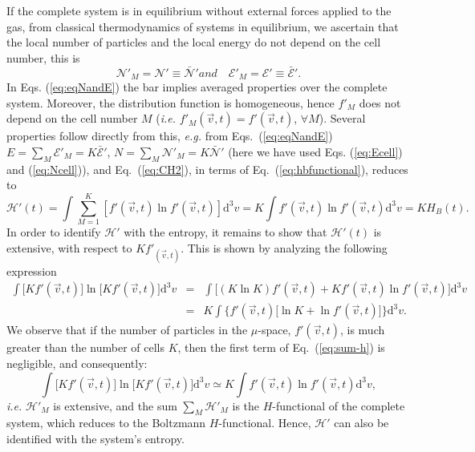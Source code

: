 If the complete system is in equilibrium without external forces applied to
the gas, from classical thermodynamics of
systems in equilibrium, we ascertain that the local number
of particles and the local
energy do not depend on the cell number, this is
%
\begin{subequations}\label{eq:eqNandE}
\begin{equation}
   \mathcal{N}'_M=\mathcal{N}'\equiv \bar{\mathcal{N}}'
\end{equation}
%
and
%
\begin{equation}
   \quad\mathcal{E}'_M=\mathcal{E}'\equiv\bar{\mathcal{E}}'.
\end{equation}
\end{subequations}
%
In Eqs. (\ref{eq:eqNandE}) the bar implies averaged properties over the complete system.
Moreover, the distribution function is homogeneous, hence $f'_M$
does not depend on the cell number $M$ (\textit{i.e.} $f'_M(\vec v,t)=f'(\vec v,t)$,
$\forall M$). Several properties follow directly from this, \textit{e.g.}
from Eqs.~(\ref{eq:eqNandE}) $E=\sum_M\mathcal{E}'_M=K\bar{\mathcal{E}}'$, $N=\sum_M\mathcal{N}'_M=K\bar{\mathcal{N}}'$ (here we have used Eqs. (\ref{eq:Ecell})
and (\ref{eq:Ncell})),
and Eq.~(\ref{eq:CH2}), in terms of Eq.~(\ref{eq:hbfunctional}), reduces to
%
\begin{equation}
    \mathcal{H}'(t)=\int \sum_{M=1}^{K} [f'(\vec{v},t)\ln f'(\vec{v},t)] \mathrm{d}^{3}v
         = K\int  f'(\vec{v},t) \ln f'(\vec{v},t) \mathrm{d}^{3}v= K H_{B}(t).
\end{equation}
%
In order to identify $\mathcal{H}'$ with the entropy, it remains to show that $\mathcal{H}'(t)$ is extensive,
with respect to $Kf'_(\vec v,t)$.
This is shown by analyzing the following expression
%
\begin{eqnarray}\label{eq:sum-h}
    \int \big[Kf'(\vec{v},t)\big] \ln \big[Kf'(\vec{v},t)\big] \mathrm{d}^{3}v & = & 
        \int \big[(K\ln K)f'(\vec{v},t) + Kf'(\vec{v},t) \ln f'(\vec{v},t)\big]\mathrm{d}^{3}v\nonumber\\
        & = & K\int\Big\{ f'(\vec{v},t)\big[\ln K + \ln f'(\vec{v},t)\big] \Big\}\mathrm{d}^{3}v.
\end{eqnarray}
%
We observe that if the number of particles in the $\mu$-space, $f'(\vec{v},t)$, is much greater than
the number of cells $K$, then the first term of Eq.~(\ref{eq:sum-h}) is negligible, and consequently:
%
\begin{equation}\label{aditive-property}
    \int \big[Kf'(\vec{v},t)\big] \ln \big[Kf'(\vec{v},t)\big] \mathrm{d}^{3}v \simeq
    K\int f'(\vec{v},t) \ln f'(\vec{v},t) \mathrm{d}^{3}v,
\end{equation}
%
\textit{i.e.} $\mathcal{H}'_M$ is extensive, and the sum $\sum_M\mathcal{H}'_M$ is the $H$-functional of the complete
system, which reduces to the Boltzmann $H$-functional. Hence, $\mathcal{H}'$ can also be identified with the
system's entropy.

